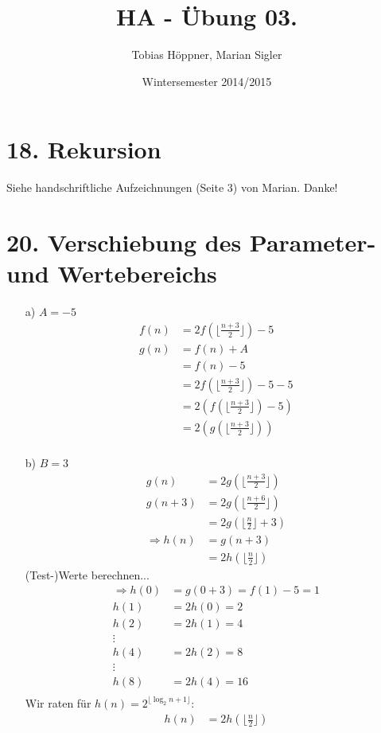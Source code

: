 \documentclass[ngerman,a4paper]{report}
\author{Tobias Höppner, Marian Sigler}
\title{HA - Übung 03. }
\date{Wintersemester 2014/2015}
\renewcommand{\maketitle}{}
\begin{document}
 
\maketitle 
\section*{18. Rekursion}
Siehe handschriftliche Aufzeichnungen (Seite 3) von Marian. Danke!
\section*{20. Verschiebung des Parameter- und Wertebereichs}
\begin{enumerate}
\item[a)] $A = -5$
\begin{align*}
f(n)&=2f(\lfloor \frac{n+3}{2}\rfloor)-5\\
g(n)&=f(n)+A\\
&=f(n)-5\\
&=2f(\lfloor \frac{n+3}{2}\rfloor)-5-5\\
&=2(f(\lfloor \frac{n+3}{2}\rfloor)-5)\\
&=2(g(\lfloor \frac{n+3}{2}\rfloor))\\
\end{align*}
\item[b)] $B = 3$
\begin{align*}
g(n)&=2g(\lfloor \frac{n+3}{2}\rfloor)\\
g(n+3)&=2g(\lfloor \frac{n+6}{2}\rfloor)\\
&=2g(\lfloor \frac{n}{2}\rfloor+3)\\
\Rightarrow h(n) &= g(n+3)\\
&= 2h(\lfloor \frac{n}{2}\rfloor)
\end{align*}
(Test-)Werte berechnen...
\begin{align*}
\Rightarrow h(0) &= g(0+3) = f(1) - 5 = 1\\
h(1) &= 2h(0) = 2\\
h(2) &= 2h(1) = 4\\
\vdots\\
h(4) &= 2h(2) = 8\\
\vdots\\
h(8) &= 2h(4) =16\\
\end{align*}
Wir raten für $h(n) = 2^{\lfloor \log_2 n+1 \rfloor}$:\\
\begin{align*}
h(n) &= 2h({\lfloor \frac{n}{2} \rfloor})\\

\end{align*}
\end{enumerate}
\end{document}
